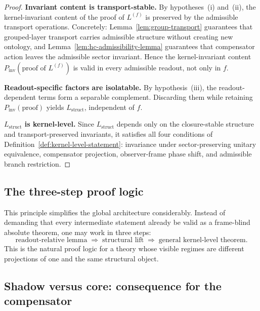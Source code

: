 \begin{proof}
\noindent\textbf{Invariant content is transport-stable.}
By hypotheses~(i) and~(ii), the kernel-invariant content of the proof
of $L^{(f)}$ is preserved by the admissible transport operations.
Concretely: Lemma~\ref{lem:group-transport} guarantees that grouped-layer
transport carries admissible structure without creating new ontology, and
Lemma~\ref{lem:hc-admissibility-lemma} guarantees that compensator action
leaves the admissible sector invariant. Hence the kernel-invariant content
$P_{\mathrm{inv}}(\text{proof of }L^{(f)})$ is valid in every admissible
readout, not only in $f$.

\smallskip
\noindent\textbf{Readout-specific factors are isolatable.}
By hypothesis~(iii), the readout-dependent terms form a separable complement.
Discarding them while retaining $P_{\mathrm{inv}}(\text{proof})$ yields
$L_{\mathrm{struct}}$, independent of $f$.

\smallskip
\noindent\textbf{$L_{\mathrm{struct}}$ is kernel-level.}
Since $L_{\mathrm{struct}}$ depends only on the closure-stable structure
and transport-preserved invariants, it satisfies all four conditions of
Definition~\ref{def:kernel-level-statement}: invariance under
sector-preserving unitary equivalence, compensator projection,
observer-frame phase shift, and admissible branch restriction.
\end{proof}

\subsection*{The three-step proof logic}

This principle simplifies the global architecture considerably.
Instead of demanding that every intermediate statement already be valid
as a frame-blind absolute theorem, one may work in three steps:
\[
  \text{readout-relative lemma}
  \;\Longrightarrow\;
  \text{structural lift}
  \;\Longrightarrow\;
  \text{general kernel-level theorem}.
\]
This is the natural proof logic for a theory whose visible regimes are
different projections of one and the same structural object.

\subsection*{Shadow versus core: consequence for the compensator}

